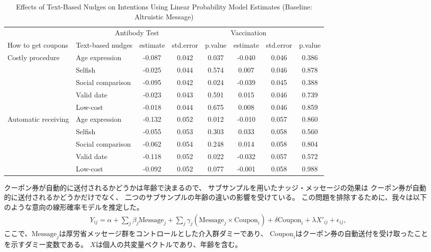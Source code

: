 \documentclass[
  11pt,
  a4paper,
]{article}
\begin{document}
\begin{table}

\caption{\label{tab:int-reg-ftest2}Effects of Text-Based Nudges on Intentions Using Linear Probability Model Estimates (Baseline: Altruistic Message)}
\centering
\begin{tabular}[t]{>{\raggedright\arraybackslash}p{5em}lcccccc}
\toprule
\multicolumn{2}{c}{ } & \multicolumn{3}{c}{Antibody Test} & \multicolumn{3}{c}{Vaccination} \\
\cmidrule(l{3pt}r{3pt}){3-5} \cmidrule(l{3pt}r{3pt}){6-8}
How to get coupons & Text-based nudges & estimate & std.error & p.value & estimate  & std.error  & p.value \\
\midrule
Costly procedure & Age expression & -0.087 & 0.042 & 0.037 & -0.040 & 0.046 & 0.386\\
 & Selfish & -0.025 & 0.044 & 0.574 & 0.007 & 0.046 & 0.878\\
 & Social comparison & -0.095 & 0.042 & 0.024 & -0.039 & 0.045 & 0.388\\
 & Valid date & -0.023 & 0.043 & 0.591 & 0.015 & 0.046 & 0.739\\
 & Low-cost & -0.018 & 0.044 & 0.675 & 0.008 & 0.046 & 0.859\\
Automatic receiving & Age expression & -0.132 & 0.052 & 0.012 & -0.010 & 0.057 & 0.860\\
 & Selfish & -0.055 & 0.053 & 0.303 & 0.033 & 0.058 & 0.560\\
 & Social comparison & -0.062 & 0.054 & 0.248 & 0.014 & 0.058 & 0.804\\
 & Valid date & -0.118 & 0.052 & 0.022 & -0.032 & 0.057 & 0.572\\
 & Low-cost & -0.092 & 0.052 & 0.077 & -0.001 & 0.058 & 0.988\\
\bottomrule
\end{tabular}
\end{table}

クーポン券が自動的に送付されるかどうかは年齢で決まるので、
サブサンプルを用いたナッジ・メッセージの効果は
クーポン券が自動的に送付されるかどうかだけでなく、
二つのサブサンプルの年齢の違いの影響を受けている。
この問題を排除するために、我々は以下のような意向の線形確率モデルを推定した。
\begin{align}
  Y_{ij} = \alpha + \sum_j \beta_j \text{Message}_j
           + \sum_j \gamma_j (\text{Message}_j \times \text{Coupon}_i)
           + \delta \text{Coupon}_i + \lambda X'_{ij} + \epsilon_{ij},
\end{align}
ここで、\(\text{Message}_j\)は厚労省メッセージ群をコントロールとした介入群ダミーであり、
\(\text{Coupon}_i\)はクーポン券の自動送付を受け取ったことを示すダミー変数である。
\(X\)は個人の共変量ベクトルであり、年齢を含む。
\end{document}
